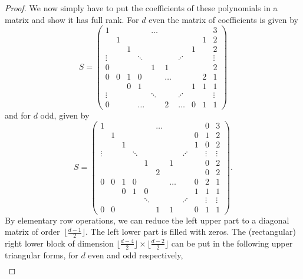 \documentclass[10pt,a4paper]{amsart}
\numberwithin{equation}{section}
\begin{document}
\begin{proof}
We now simply have to put the coefficients of these polynomials in a matrix and show it has full rank.
For $d$ even the matrix of coefficients is given by
\[S=
\begin{pmatrix}
1      &       &   &   & \dots&&         &   &  & 3\\
      & 1     &   &        & &&         &  & 1 & 2\\
	   &       & 1 &        & &&         & 1 &  & 2\\
\vdots &       &   & \ddots & && \iddots &   &   & \vdots \\
0	   &       &   &        &1&1&         &  &   & 2 \\
0 & 0 &1      & 0 &   &  		 \dots		&      	&   &   2& 1\\
  &  &0  & 1 &  &        	 			&      	& 1 & 1 &1\\
\vdots  & &       &   & \ddots &   	    		&  	 \iddots 	&  & 	   & \vdots\\
0 & &       & \dots   &   &   	 	 2 		&     \dots    &   0  & 1 & 1
\end{pmatrix}
\]
and for $d$ odd, given by
\[S=
	\begin{pmatrix}
1 &   & & & & \dots & & & & 0 & 3\\
  & 1 &   &  & &      &  &        & 0 & 1 & 2\\
	   &       & 1 &&        & &&         & 1 & 0 & 2\\
\vdots &       &   & \ddots& & && \iddots &   &  \vdots & \vdots \\
       &       &   &       & 1&&1&&& 0&2 \\
	   &       &   &        &&2&         &   &  &0 & 2 \\
0&0 &1      & 0 &   &  		 &\dots	 &      	&  0&   2& 1\\
  & &0      & 1 & 0 &       &			&      	& 1 & 1 &1\\
  & &       &   & \ddots &  &   		&  	 \iddots 	&  & 	  \vdots & \vdots\\
 0&0 &       &   &     	 	& 1&1 		&         &     0& 1& 1
\end{pmatrix}.
\]
By elementary row operations, we can reduce the left upper part to a diagonal matrix of order~$\big\lfloor \frac{d-1}{2}\big\rfloor$. The left lower part is filled with zeros. The (rectangular) right lower block of dimension $\big\lfloor \frac{d-4}{2}\big\rfloor\times \big\lfloor \frac{d-2}{2}\big\rfloor$ can be put in the following upper triangular forms, for $d$ even and odd respectively,
 \begin{gather*}

\end{gather*}
\end{proof}
\end{document}
